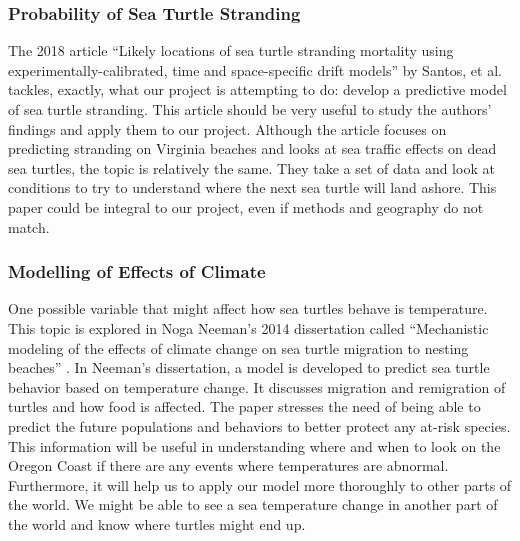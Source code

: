 \documentclass[onecolumn, draftclsnofoot,10pt, compsoc]{IEEEtran}
\begin{document}
\begin{singlespace}
\subsubsection{Probability of Sea Turtle Stranding}
The 2018 article ``Likely locations of sea turtle stranding mortality using experimentally-calibrated,
time and space-specific drift models'' by Santos, et al. \cite{SantosBiancaS.2018Llos} tackles, exactly, what
our project is attempting to do: develop a predictive model of sea turtle stranding. This
article should be very useful to study the authors’ findings and apply them to our project.
Although the article focuses on predicting stranding on Virginia beaches and looks at sea
traffic effects on dead sea turtles, the topic is relatively the same. They take a set of data
and look at conditions to try to understand where the next sea turtle will land ashore.
This paper could be integral to our project, even if methods and geography do not match.
\subsubsection{Modelling of Effects of Climate}
One possible variable that might affect how sea turtles behave is temperature. This topic
is explored in Noga Neeman's 2014 dissertation called ``Mechanistic modeling of the
effects of climate change on sea turtle migration to nesting beaches'' \cite{NeemanNoga2014Mmot}. In Neeman's
dissertation, a model is developed to predict sea turtle behavior based on temperature
change. It discusses migration and remigration of turtles and how food is affected. The
paper stresses the need of being able to predict the future populations and behaviors to
better protect any at-risk species. This information will be useful in understanding
where and when to look on the Oregon Coast if there are any events where temperatures
are abnormal. Furthermore, it will help us to apply our model more thoroughly to other
parts of the world. We might be able to see a sea temperature change in another part of
the world and know where turtles might end up.

\end{singlespace}
\end{document}
